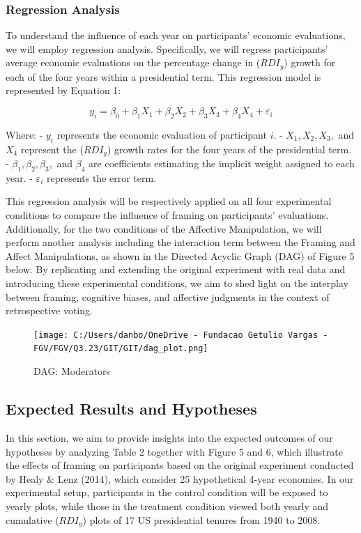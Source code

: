 \documentclass[
]{article}
\begin{document}
\hypertarget{regression-analysis}{%
\subsubsection{Regression Analysis}\label{regression-analysis}}

To understand the influence of each year on participants' economic
evaluations, we will employ regression analysis. Specifically, we will
regress participants' average economic evaluations on the percentage
change in (\(RDI_y\)) growth for each of the four years within a
presidential term. This regression model is represented by Equation 1:

\[
y_i = \beta_0 + \beta_1 X_1 + \beta_2 X_2 + \beta_3 X_3 + \beta_4 X_4 + \varepsilon_i
\]

Where: - \(y_i\) represents the economic evaluation of participant
\(i\). - \(X_1, X_2, X_3,\) and \(X_4\) represent the (\(RDI_y\)) growth
rates for the four years of the presidential term. -
\(\beta_1, \beta_2, \beta_3,\) and \(\beta_4\) are coefficients
estimating the implicit weight assigned to each year. -
\(\varepsilon_i\) represents the error term.

This regression analysis will be respectively applied on all four
experimental conditions to compare the influence of framing on
participants' evaluations. Additionally, for the two conditions of the
Affective Manipulation, we will perform another analysis including the
interaction term between the Framing and Affect Manipulations, as shown
in the Directed Acyclic Graph (DAG) of Figure 5 below. By replicating
and extending the original experiment with real data and introducing
these experimental conditions, we aim to shed light on the interplay
between framing, cognitive biases, and affective judgments in the
context of retrospective voting.

\begin{figure}
\hypertarget{fig:label}{%
\centering
\texttt{[image: C:/Users/danbo/OneDrive - Fundacao Getulio Vargas - FGV/FGV/Q3.23/GIT/GIT/dag\_plot.png]}
\caption{DAG: Moderators}\label{fig:label}
}
\end{figure}

\hypertarget{expected-results-and-hypotheses}{%
\subsection{Expected Results and
Hypotheses}\label{expected-results-and-hypotheses}}

In this section, we aim to provide insights into the expected outcomes
of our hypotheses by analyzing Table 2 together with Figure 5 and 6,
which illustrate the effects of framing on participants based on the
original experiment conducted by Healy \& Lenz (2014), which consider 25
hypothetical 4-year economies. In our experimental setup, participants
in the control condition will be exposed to yearly plots, while those in
the treatment condition viewed both yearly and cumulative (\(RDI_y\))
plots of 17 US presidential tenures from 1940 to 2008.
\end{document}
